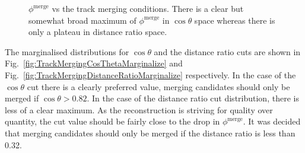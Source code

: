 \begin{figure}
  \centering
  \caption{$\phi^{\textrm{merge}}$ vs the track merging conditions.  There is a clear but somewhat broad maximum of $\phi^{\textrm{merge}}$ in $\cos\theta$ space whereas there is only a plateau in distance ratio space.}
  \label{fig:TrackMergingMarginalizedDistributions}
\end{figure}
The marginalised distributions for $\cos\theta$ and the distance ratio cuts are shown in Fig.~\ref{fig:TrackMergingCosThetaMarginalize} and Fig.~\ref{fig:TrackMergingDistanceRatioMarginalize} respectively.  In the case of the $\cos\theta$ cut there is a clearly preferred value, merging candidates should only be merged if $\cos\theta > 0.82$.  In the case of the distance ratio cut distribution, there is less of a clear maximum.  As the reconstruction is striving for quality over quantity, the cut value should be fairly close to the drop in $\phi^{\textrm{merge}}$.  It was decided that merging candidates should only be merged if the distance ratio is less than 0.32.
